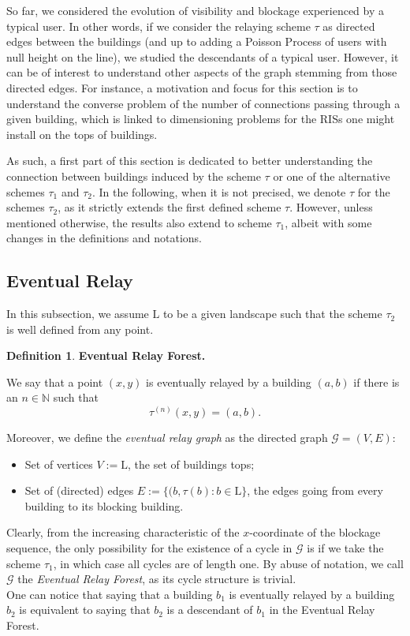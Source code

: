 \documentclass[10pt,english,a4paper]{smfart}
\theoremstyle{definition}
\newtheorem{definition}{Definition}[section]
\theoremstyle{remark}
\newcommand{\N}{\mathbb{N}}
\newcommand{\landsc}{\mathrm{L}}
\newcommand{\graph}{\mathcal{G}}
\begin{document}
So far, we considered the evolution of visibility and blockage experienced by a typical user. In other words, if we consider the relaying scheme $\tau$ as directed edges between the buildings (and up to adding a Poisson Process of users with null height on the line), we studied the descendants of a typical user. However, it can be of interest to understand other aspects of the graph stemming from those directed edges. For instance, a motivation and focus for this section is to understand the converse problem of the number of connections passing through a given building, which is linked to dimensioning problems for the RISs one might install on the tops of buildings. 

As such, a first part of this section is dedicated to better understanding the connection between buildings induced by the scheme $\tau$ or one of the alternative schemes $\tau_1$ and $\tau_2$. In the following, when it is not precised, we denote $\tau$ for the schemes $ \tau_2$, as it strictly extends the first defined scheme $\tau$. However, unless mentioned otherwise, the results also extend to scheme $\tau_1$, albeit with some changes in the definitions and notations.

\subsection{Eventual Relay}

In this subsection, we assume $\landsc$ to be a given landscape such that the scheme $\tau_2$ is well defined from any point.

\begin{definition}\textbf{Eventual Relay Forest.}

We say that a point $(x, y)$ is eventually relayed by a building $(a, b)$ if there is an $n\in \N$ such that
\[\tau^{(n)}(x, y) = (a, b).\]

Moreover, we define the \textit{eventual relay graph} as the directed graph $\graph = (V, E)$:
\begin{itemize}
    \item Set of vertices $V := \landsc$, the set of buildings tops;
    \item Set of (directed) edges $E := \{(b, \tau(b):b\in \landsc\}$, the edges going from every building to its blocking building.
\end{itemize}

Clearly, from the increasing characteristic of the $x$-coordinate of the blockage sequence, the only possibility for the existence of a cycle in $\graph$ is if we take the scheme $\tau_1$, in which case all cycles are of length one. By abuse of notation, we call  $\graph$ the \textit{Eventual Relay Forest}, as its cycle structure is trivial.\\
One can notice that saying that a building $b_1$ is eventually relayed by a building $b_2$ is equivalent to saying that $b_2$ is a descendant of $b_1$ in the Eventual Relay Forest.
\end{definition}
\end{document}
